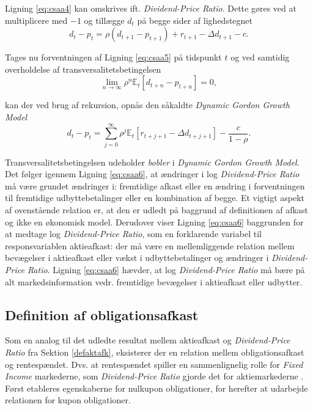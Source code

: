 \documentclass[
  a4paper,
  oneside]{memoir}
\begin{document}
Ligning \eqref{eq:csaa4} kan omskrives ift. \emph{Dividend-Price Ratio}. Dette gøres ved at multiplicere med \(-1\) og tillægge \(d_t\) på begge sider af lighedstegnet
\begin{equation}
d_t-p_t=\rho(d_{t+1}-p_{t+1}) + r_{t+1} -\Delta d_{t+1}-c. \label{eq:csaa5}
\end{equation}

Tages nu forventningen af Ligning \eqref{eq:csaa5} på tidspunkt \(t\) og ved samtidig overholdelse af transversalitetsbetingelsen
\[\lim_{n\to\infty } \rho^n\mathbb{E}_t\left[d_{t+n}-p_{t+n}\right]= 0,\]

kan der ved brug af rekursion, opnås den såkaldte \emph{Dynamic Gordon Growth Model}
\begin{equation}
d_t-p_t=\sum_{j=0}^\infty \rho^j \mathbb{E}_t\left[r_{t+j+1}-\Delta d_{t+j+1}\right]-\frac{c}{1-\rho}. \label{eq:csaa6}
\end{equation}

Transversalitetsbetingelsen udeholder \emph{bobler} i \emph{Dynamic Gordon Growth Model}. Det følger igennem Ligning \eqref{eq:csaa6}, at ændringer i log \emph{Dividend-Price Ratio} må være grundet ændringer i: fremtidige afkast eller en ændring i forventningen til fremtidige udbyttebetalinger eller en kombination af begge. Et vigtigt aspekt af ovenstående relation er, at den er udledt på baggrund af definitionen af afkast og ikke en økonomisk model. Derudover viser Ligning \eqref{eq:csaa6} baggrunden for at medtage log \emph{Dividend-Price Ratio}, som en forklarende variabel til responsvariablen aktieafkast: der må være en mellemliggende relation mellem bevægelser i aktieafkast eller vækst i udbyttebetalinger og ændringer i \emph{Dividend-Price Ratio}. Ligning \eqref{eq:csaa6} hævder, at log \emph{Dividend-Price Ratio} må bære på alt markedsinformation vedr. fremtidige bevægelser i aktieafkast eller udbytter.

\hypertarget{defafobl}{%
\subsection{Definition af obligationsafkast}\label{defafobl}}

Som en analog til det udledte resultat mellem aktieafkast og \emph{Dividend-Price Ratio} fra Sektion \ref{defaktafk}, eksisterer der en relation mellem obligationsafkast og rentespændet. Dvs. at rentespændet spiller en sammenlignelig rolle for \emph{Fixed Income} markederne, som \emph{Dividend-Price Ratio} gjorde det for aktiemarkederne \citep{Campbell1997}. Først etableres egenskaberne for nulkupon obligationer, for herefter at udarbejde relationen for kupon obligationer.
\end{document}
